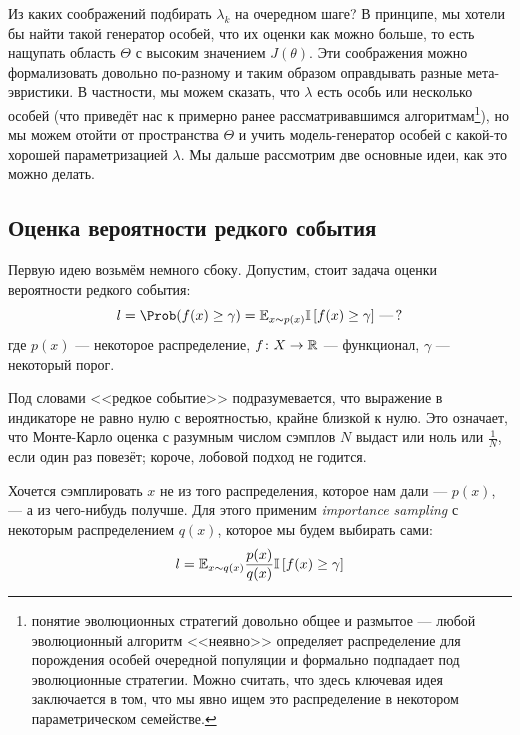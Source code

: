 Из каких соображений подбирать $\lambda_k$ на очередном шаге? В принципе, мы хотели бы найти такой генератор особей, что их оценки как можно больше, то есть нащупать область $\Theta$ с высоким значением $J(\theta)$. Эти соображения можно формализовать довольно по-разному и таким образом оправдывать разные мета-эвристики. В частности, мы можем сказать, что $\lambda$ есть особь или несколько особей (что приведёт нас к примерно ранее рассматривавшимся алгоритмам\footnote{понятие эволюционных стратегий довольно общее и размытое --- любой эволюционный алгоритм <<неявно>> определяет распределение для порождения особей очередной популяции и формально подпадает под эволюционные стратегии. Можно считать, что здесь ключевая идея заключается в том, что мы явно ищем это распределение в некотором параметрическом семействе.}), но мы можем отойти от пространства $\Theta$ и учить модель-генератор особей с какой-то хорошей параметризацией $\lambda$. Мы дальше рассмотрим две основные идеи, как это можно делать.

\subsection{Оценка вероятности редкого события}

Первую идею возьмём немного сбоку. Допустим, стоит задача оценки вероятности редкого события:
\begin{equation}\label{rareeventestimation}
l = \Prob(f(x) \ge \gamma) = \E_{x \sim p(x)} \mathbb{I}\left[ f(x) \ge \gamma \right] \,\text{---}\, ?
\end{equation}
где $p(x)$ --- некоторое распределение, $f \colon X \to \mathbb{R}$ --- функционал, $\gamma$ --- некоторый порог. 

Под словами <<редкое событие>> подразумевается, что выражение в индикаторе не равно нулю с вероятностью, крайне близкой к нулю. Это означает, что Монте-Карло оценка с разумным числом сэмплов $N$ выдаст или ноль или $\frac{1}{N}$, если один раз повезёт; короче, лобовой подход не годится.

Хочется сэмплировать $x$ не из того распределения, которое нам дали --- $p(x)$, --- а из чего-нибудь получше. Для этого применим \emph{importance sampling} с некоторым распределением $q(x)$, которое мы будем выбирать сами:
\begin{equation}\label{is_repe}
l = \mathbb{E}_{x \sim q(x)} \frac{p(x)}{q(x)} \mathbb{I}\left[ f(x) \ge \gamma \right]
\end{equation}


